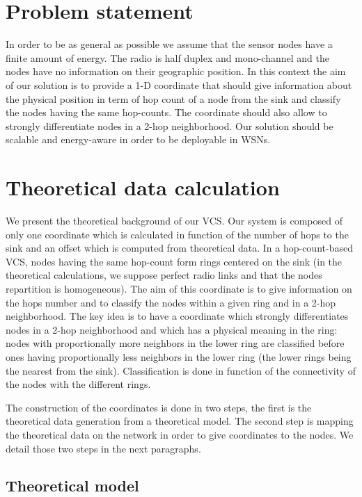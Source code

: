 \documentclass[a4paper]{article}
\begin{document}
\section{Problem statement}
In order to be as general as possible we assume that the sensor nodes have a finite amount of energy. The radio is half duplex and mono-channel and the nodes have no information on their geographic position. In this  context the aim of our solution is to provide a 1-D coordinate that should give information about the physical position in term of hop count of a node from the sink and classify the nodes having the same hop-counts. The coordinate should also allow to strongly differentiate nodes in a 2-hop neighborhood. Our solution should be scalable and energy-aware in order to be deployable in WSNs.

\section{Theoretical data calculation}

We present the theoretical background of our VCS. Our system is composed of only one coordinate which is calculated in function of the number of hops to the sink and an offset which is computed from theoretical data. In a hop-count-based VCS, nodes having the same hop-count form rings centered on the sink (in the theoretical calculations, we suppose perfect radio links and that the nodes repartition is homogeneous). The aim of this coordinate is to give information on the hops number and to classify the nodes within a given ring and in a 2-hop neighborhood. The key idea is to have a coordinate which strongly differentiates nodes in a 2-hop neighborhood and which has a physical meaning in the ring: nodes with proportionally more neighbors in the lower ring are classified before ones having proportionally less neighbors in the lower ring (the lower rings being the nearest from the sink). Classification is done in function of the connectivity of the nodes with the different rings. 

The construction of the coordinates is done in two steps, the first is the theoretical data generation from a theoretical model. The second step is mapping the theoretical data on the network in order to give coordinates to the nodes. We detail those two steps in the next paragraphs.

\subsection{Theoretical model}
\end{document}
